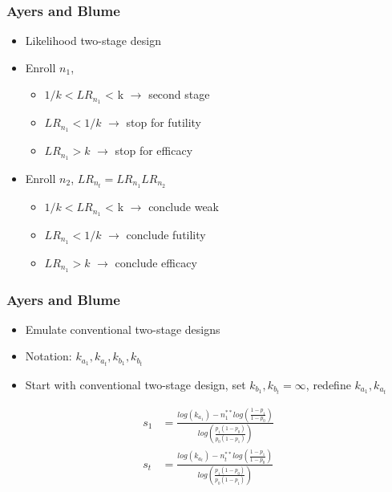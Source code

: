 \documentclass{beamer}\usepackage[]{graphicx}\usepackage[]{color}
\begin{document}
\begin{frame}
\frametitle{Ayers and Blume}
    \begin{itemize}
        \item Likelihood two-stage design
        \item Enroll $n_1$, 
        \begin{itemize}
           \item $1/k < LR_{n_1}$ < k $\rightarrow$ second stage
           \item $LR_{n_1} < 1/k$ $\rightarrow$ stop for futility
           \item $LR_{n_1} > k$ $\rightarrow$ stop for efficacy
        \end{itemize}
        \item Enroll $n_2$, $LR_{n_t}=LR_{n_1}LR_{n_2}$
        \begin{itemize}
           \item $1/k < LR_{n_1}$ < k $\rightarrow$ conclude weak
           \item $LR_{n_1} < 1/k$ $\rightarrow$ conclude futility
           \item $LR_{n_1} > k$ $\rightarrow$ conclude efficacy
        \end{itemize}
    \end{itemize}
\end{frame}

\begin{frame}
\frametitle{Ayers and Blume}
    \begin{itemize}
        \item Emulate conventional two-stage designs %
        \item Notation: $k_{a_1}, k_{a_t}, k_{b_1}, k_{b_t}$
        \item Start with conventional two-stage design, set $k_{b_1}, k_{b_t} = \infty$, redefine $k_{a_1}, k_{a_t}$
    \end{itemize}
\begin{equation}
\begin{aligned}
s_1 &= \frac{log(k_{a_1}) - n_1^{\ast\ast} log\left(\frac{1-p_1}{1-p_0}\right)}{log\left(\frac{p_1(1-p_0)}{p_0(1-p_1)}\right)} \\
s_t &= \frac{log(k_{a_t}) - n_t^{\ast\ast} log\left(\frac{1-p_1}{1-p_0}\right)}{log\left(\frac{p_1(1-p_0)}{p_0(1-p_1)}\right)}
\end{aligned}
\end{equation}
\end{frame}
\end{document}
